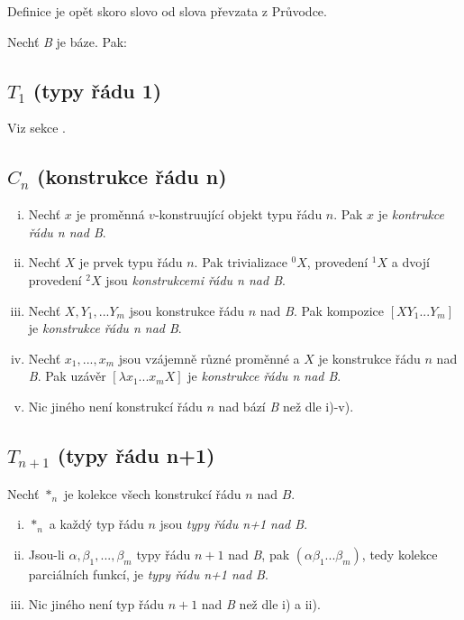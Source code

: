 Definice je opět skoro slovo od slova převzata z Průvodce\cite{til-duzi}.

Nechť \textit{B} je báze. Pak:

\subsection{$T_1$ (typy řádu 1)}
Viz sekce .

\subsection{$C_n$ (konstrukce řádu n)}

\begin{enumerate}[i)]
    \item Nechť $x$ je proměnná $v$-konstruující objekt typu řádu $n$. Pak $x$ je
        \textit{kontrukce řádu n nad B}.
    \item Nechť $X$ je prvek typu řádu $n$. Pak trivializace ${}^0X$, provedení ${}^1X$ a dvojí
        provedení ${}^2X$ jsou \textit{konstrukcemi řádu n nad B}.
    \item Nechť $X, Y_1, ... Y_m$ jsou konstrukce řádu $n$ nad \textit{B}. Pak kompozice 
        $[X Y_1...Y_m]$ je \textit{konstrukce řádu n nad B}.
    \item Nechť $x_1,...,x_m$ jsou vzájemně různé proměnné a $X$ je konstrukce řádu $n$
        nad \textit{B}. Pak uzávěr $[\lambda x_1 ... x_m X]$ je \textit{konstrukce řádu n nad B}.
    \item Nic jiného není konstrukcí řádu $n$ nad bází \textit{B} než dle i)-v).
\end{enumerate}

\subsection{$T_{n+1}$ (typy řádu n+1)}

Nechť $*_n$ je kolekce všech konstrukcí řádu $n$ nad $B$.

\begin{enumerate}[i)]
    \item $*_n$ a každý typ řádu $n$ jsou \textit{typy řádu n+1 nad B}.
    \item Jsou-li $\alpha, \beta_1,...,\beta_m$ typy řádu $n+1$ nad \textit{B}, pak
        $(\alpha \beta_1...\beta_m)$, tedy kolekce parciálních funkcí, je
        \textit{typy řádu n+1 nad B}.
    \item Nic jiného není typ řádu $n+1$ nad \textit{B} než dle i) a ii).
\end{enumerate}

